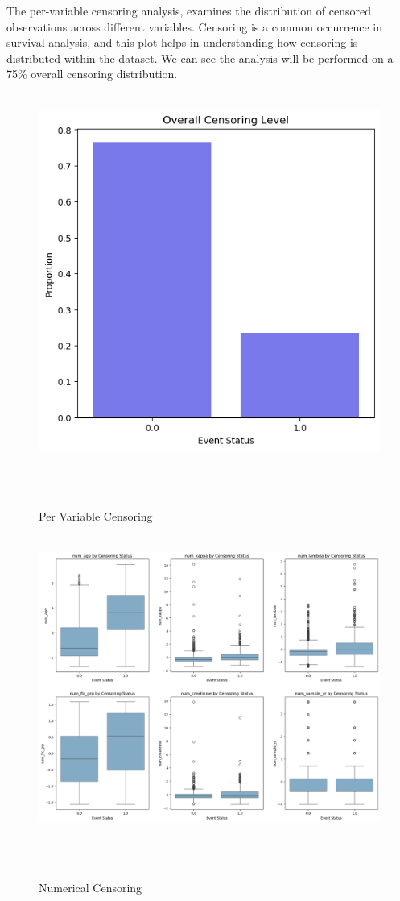 \clearpage
\noindent The per-variable censoring analysis, examines the distribution of censored observations across different variables. Censoring is a common occurrence in survival analysis, and this plot helps in understanding how censoring is distributed within the dataset. We can see the analysis will be performed on a 75\% overall censoring distribution.
\begin{figure}[h]
    \centering
    \includegraphics[scale=0.33]{Figures/EDA/censor_over.png}
    \caption{Per Variable Censoring}
    \label{fig:your_label}
\end{figure}

\begin{figure}[h]
    \centering
    \includegraphics[scale=0.32]{Figures/EDA/censor.png}
    \caption{Numerical Censoring}
    \label{fig:your_label}
\end{figure}
\clearpage

